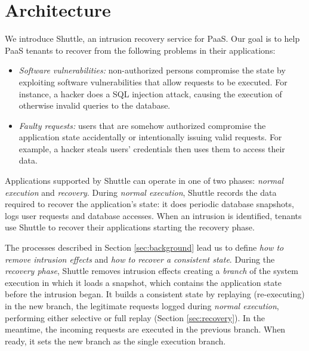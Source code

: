 
\section{Architecture}
\label{sec:architecture}

We introduce Shuttle, an intrusion recovery service for \ac{PaaS}. Our goal is to help \ac{PaaS} tenants to recover from the following problems in their applications:
\begin{itemize}
  \item \textit{Software vulnerabilities:} non-authorized persons compromise the state by exploiting software vulnerabilities that allow requests to be executed. For instance, a hacker does a SQL injection attack, causing the execution of otherwise invalid queries to the database.
  \item \textit{Faulty requests:} users that are somehow authorized compromise the application state accidentally or intentionally issuing valid requests. For example, a hacker steals users' credentials then uses them to access their data.
\end{itemize} 


Applications supported by Shuttle can operate in one of two phases: \textit{normal execution} and \textit{recovery}. During \emph{normal execution}, Shuttle records the data required to recover the application's state: it does periodic database snapshots, logs  user requests and database accesses. When an intrusion is identified, tenants use Shuttle to recover their applications starting the recovery phase.

The processes described in Section \ref{sec:background} lead us to define \textit{how to remove intrusion effects} and \textit{how to recover a consistent state}. During the \emph{recovery phase}, Shuttle removes  intrusion effects creating a \textit{branch} of the system execution in which it loads a snapshot, which contains the application state before the intrusion began. It builds a consistent state by replaying (re-executing) in the new branch, the legitimate requests logged during \emph{normal execution}, performing either selective or full replay (Section \ref{sec:recovery}). In the meantime, the incoming requests are executed in the previous branch. When ready, it sets the new branch as the single execution branch.

